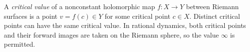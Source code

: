 
A \emph{critical value} of a nonconstant holomorphic map $f:X\to Y$ between Riemann surfaces is a point $v=f(c)\in Y$ for some critical point $c\in X$. Distinct critical points can have the same critical value. In rational dynamics, both critical points and their forward images are taken on the Riemann sphere, so the value $\infty$ is permitted.
